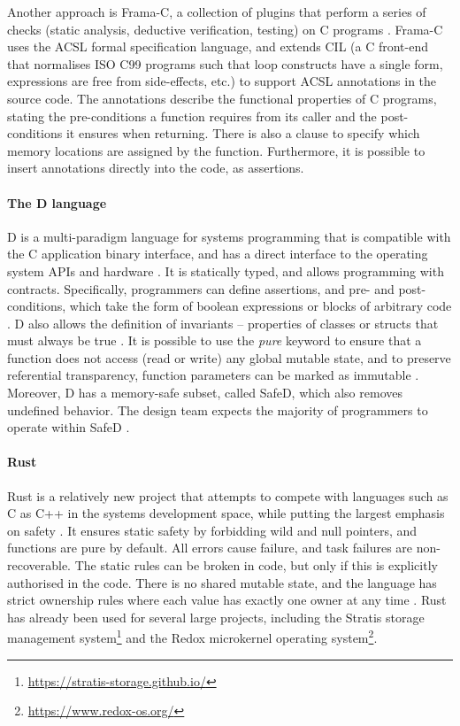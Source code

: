 Another approach is Frama-C, a collection of plugins that perform a series of checks (static analysis, deductive verification, testing) on C programs \cite{cuoq2012}.
Frama-C uses the ACSL formal specification language, and extends CIL (a C front-end that normalises ISO C99 programs such that loop constructs have a single form, expressions are free from side-effects, etc.) to support ACSL annotations in the source code.
The annotations describe the functional properties of C programs, stating the pre-conditions a function requires from its caller and the post-conditions it ensures when returning.
There is also a clause to specify which memory locations are assigned by the function.
Furthermore, it is possible to insert annotations directly into the code, as assertions.

\paragraph{The D language}
D is a multi-paradigm language for systems programming that is compatible with the C application binary interface, and has a direct interface to the operating system APIs and hardware \cite{dlangTour}.
It is statically typed, and allows programming with contracts.
Specifically, programmers can define assertions, and pre- and post-conditions, which take the form of boolean expressions or blocks of arbitrary code \cite{dlangContracts}.
D also allows the definition of invariants -- properties of classes or structs that must always be true \cite{dlangContracts}.
It is possible to use the \textit{pure} keyword to ensure that a function does not access (read or write) any global mutable state, and to preserve referential transparency, function parameters can be marked as immutable \cite{nadlinger2012}.
Moreover, D has a memory-safe subset, called SafeD, which also removes undefined behavior.
The design team expects the majority of programmers to operate within SafeD \cite{milewski}.

\paragraph{Rust}
Rust is a relatively new project that attempts to compete with languages such as C as C++ in the systems development space, while putting the largest emphasis on safety \cite{hoare2010}.
It ensures static safety by forbidding wild and null pointers, and functions are pure by default.
All errors cause failure, and task failures are non-recoverable.
The static rules can be broken in code, but only if this is explicitly authorised in the code.
There is no shared mutable state, and the language has strict ownership rules where each value has exactly one owner at any time \cite{klabnik2019}.
Rust has already been used for several large projects, including the Stratis storage management system\footnote{\url{https://stratis-storage.github.io/}} and the Redox microkernel operating system\footnote{\url{https://www.redox-os.org/}}.

